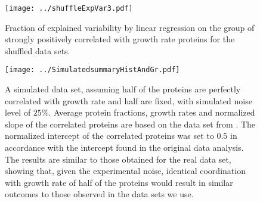 \documentclass{article}
\begin{document}
\begin{figure}[H]
\begin{center}
\texttt{[image: ../shuffleExpVar3.pdf]}
\caption{\label{fig:shuffledexpvar}
Fraction of explained variability by linear regression on the group of strongly positively correlated with growth rate proteins for the shuffled data sets.
%
}
\end{center}
\end{figure}

\begin{figure}[H]
\begin{center}
\texttt{[image: ../SimulatedsummaryHistAndGr.pdf]}
\caption{\label{fig:simulated}
A simulated data set, assuming half of the proteins are perfectly correlated with growth rate and half are fixed, with simulated noise level of $25\%$.
Average protein fractions, growth rates and normalized slope of the correlated proteins are based on the data set from \cite{Heinemann2015}.
The normalized intercept of the correlated proteins was set to $0.5$ in accordance with the intercept found in the original data analysis.
The results are similar to those obtained for the real data set, showing that, given the experimental noise, identical coordination with growth rate of half of the proteins would result in similar outcomes to those observed in the data sets we use.%
}
\end{center}
\end{figure}
\end{document}
